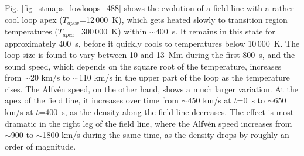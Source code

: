 \documentclass{aa}
\begin{document}
{%


Fig. \ref{fig_stmaps_lowloops_488} shows the evolution of a field line with a rather cool loop apex ($T_{apex}$=12\,000~K), which gets heated slowly to transition region temperatures ($T_{apex}$=300\,000~K) within $\sim$400~s. It remains in this state for approximately 400~s, before it quickly cools to temperatures below 10\,000~K. The loop size is found to vary between 10 and 13~Mm during the first 800~s, and the sound speed, which depends on the square root of the temperature, increases from $\sim$20 km/s to $\sim$110 km/s in the upper part of the loop as the temperature rises. The Alfv\'en speed, on the other hand, shows a much larger variation. At the apex of the field line, it increases over time from $\sim$450 km/s at $t$=0~s to $\sim$650 km/s at $t$=400~s, as the density along the field line decreases. The effect is most dramatic in the right leg of the field line, where the Alfv\'en speed increases from $\sim$900 to $\sim$1800 km/s during the same time, as the density drops by roughly an order of magnitude. 

}
\end{document}
